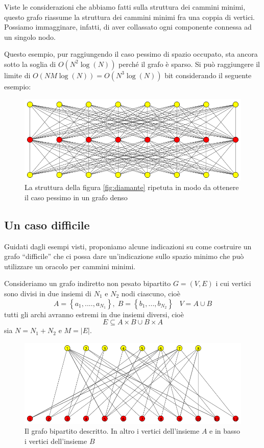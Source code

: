 \documentclass[a4paper,10pt]{amsbook}
\theoremstyle{plain}
\theoremstyle{definition}
\theoremstyle{remark}
\newcommand{\set}[1]{\left\{#1\right\}}
\newcommand{\pa}[1]{\left(#1\right)}
\newcommand{\abs}[1]{\left|#1\right|}
\begin{document}
Viste le considerazioni che abbiamo fatti sulla struttura dei cammini
minimi, questo grafo riassume la struttura dei cammini minimi fra una
coppia di vertici. Possiamo immagginare, infatti, di aver collassato
ogni componente connessa ad un singolo nodo.

Questo esempio, pur raggiungendo il caso pessimo di spazio occupato,
sta ancora sotto la soglia di $O\pa{N^2\log\pa{N}}$ perch\'e il grafo
\`e sparso. Si pu\`o raggiungere il limite di $O\pa{ N M \log \pa{N} }
= O\pa{N^3 \log\pa{N}}$ bit considerando il seguente esempio:

\begin{figure}[H]
  \centering
  \includegraphics[width=1\textwidth]{diamantemultiplo}
  \caption{La struttura della figura \ref{fig:diamante} ripetuta in
    modo da ottenere il caso pessimo in un grafo denso}
  \label{fig:diamantemultiplo}
\end{figure}


\subsection{Un caso difficile}

Guidati dagli esempi visti, proponiamo alcune indicazioni su come
costruire un grafo ``difficile'' che ci possa dare un'indicazione
sullo spazio minimo che pu\`o utilizzare un oracolo per cammini
minimi.

Consideriamo un grafo indiretto non pesato bipartito $G = (V,E)$ i cui
vertici sono divisi in due insiemi di $N_1$ e $N_2$ nodi ciascuno,
cio\`e
\[ A = \set{a_1,....,a_{N_1} } ,\; B = \set{b_1,...,b_{N_2}} \;\;\; V =
A\cup B \]
tutti gli archi avranno estremi in due insiemi diversi, cio\`e
\[ E \subseteq A \times B \cup B \times A \]
sia $N = N_1 + N_2$ e $M = \abs{E}$.

\begin{figure}[h]
  \centering
  \includegraphics[width=1\textwidth]{bipartito}
  \caption{Il grafo bipartito descritto. In altro i vertici
    dell'insieme $A$ e in basso i vertici dell'insieme $B$}
  \label{fig:bipartito}
\end{figure}
\end{document}
